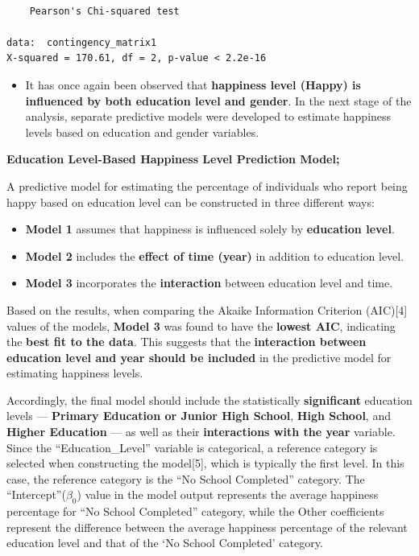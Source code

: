 \documentclass[
  11pt,
  a4paper,
  DIV=11,
  numbers=noendperiod]{scrartcl}
\providecommand{\tightlist}{%
  \setlength{\itemsep}{0pt}\setlength{\parskip}{0pt}}\usepackage{longtable,booktabs,array}
\begin{document}
\begin{verbatim}

    Pearson's Chi-squared test

data:  contingency_matrix1
X-squared = 170.61, df = 2, p-value < 2.2e-16
\end{verbatim}

\begin{itemize}
\tightlist
\item
  It has once again been observed that {\textbf{happiness level (Happy)
  is influenced by both education level and gender}}. In the next stage
  of the analysis, separate predictive models were developed to estimate
  happiness levels based on education and gender variables.
\end{itemize}

\textbf{Education Level-Based Happiness Level Prediction Model;}

A predictive model for estimating the percentage of individuals who
report being happy based on education level can be constructed in three
different ways:

\begin{itemize}
\item
  {\textbf{Model 1}} assumes that happiness is influenced solely by
  {\textbf{education level}}.
\item
  {\textbf{Model 2}} includes the {\textbf{effect of time (year)}} in
  addition to education level.
\item
  {\textbf{Model 3}} incorporates the {\textbf{interaction}} between
  education level and time.
\end{itemize}

Based on the results, when comparing the Akaike Information Criterion
(AIC){[}4{]} values of the models, {\textbf{Model 3}} was found to have
the {\textbf{lowest AIC}}, indicating the {\textbf{best fit to the
data}}. This suggests that the {\textbf{interaction between education
level and year should be included}} in the predictive model for
estimating happiness levels.

Accordingly, the final model should include the statistically
{\textbf{significant}} education levels --- {\textbf{Primary Education
or Junior High School}}, {\textbf{High School}}, and {\textbf{Higher
Education}} --- as well as their {\textbf{interactions with the year}}
variable. Since the ``Education\_Level'' variable is categorical, a
reference category is selected when constructing the model{[}5{]}, which
is typically the first level. In this case, the reference category is
the ``No School Completed'' category. The ``Intercept''(\(\beta_0\))
value in the model output represents the average happiness percentage
for ``No School Completed'' category, while the Other coefficients
represent the difference between the average happiness percentage of the
relevant education level and that of the `No School Completed' category.
\end{document}
